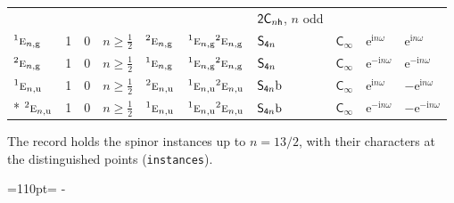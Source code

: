 \documentclass[10pt,a4paper]{article}
\makeatletter
\def\grouprule#1#2{\noalign{\marks\LTgroupmarks{\the\belowrulesep}\nobreak\vskip#1%
  \vskip\aboverulesep}\multispan\LT@cols\unskip{\leaders\hrule\@height#2\hfill\kern\z@}\cr
  \noalign{\penalty\LTrulebreak\vskip\belowrulesep\global\@lastruleclass\z@}}
\newcommand{\needspace}[1]{\par\penalty-100\begingroup\dimen0=#1\relax\dimen2=\pagegoal
  \advance\dimen2-\pagetotal\ifdim\dimen0>\dimen2\relax\ifdim\dimen2>0pt\vfil\break\fi\fi
  \endgroup}
\numberwithin{equation}{section}
\newcommand{\grp}[1]{\mathsf{#1}}
\newcommand{\irr}[1]{\text{\normalfont\scshape #1}}
\newcommand{\conjpair}[1]{{}^{#1}}
\newcommand{\ptag}[1]{\mathrm{#1}}
\newcommand{\iunit}{\mathrm{i}}
\newcommand{\expe}{\mathrm{e}}
\newcommand{\secondclass}{\mathrm{b}}
\makeatother
\begin{document}
{{\begin{longtable}{@{}lrrlllllll@{}}
 &  &  &  &  &  & $\grp{2C_{\mathnormal{n}h}}$, $n$ odd &  &  & \\
\grouprule{0pt}{\lightrulewidth}
$\conjpair{1}\irr{e}_{n,\ptag{g}}$ & 1 & $0$ & $n \ge \tfrac{1}{2}$ & $\conjpair{2}\irr{e}_{n,\ptag{g}}$ & $\conjpair{1}\irr{e}_{n,\ptag{g}}\conjpair{2}\irr{e}_{n,\ptag{g}}$ & $\grp{S_{4\mathnormal{n}}}$ & \href{../../../rotation/data/pdf/Cinf.pdf}{$\grp{C_{\infty}}$} & $\expe^{\iunit n\omega}$ & $\expe^{\iunit n\omega}$\\
$\conjpair{2}\irr{e}_{n,\ptag{g}}$ & 1 & $0$ & $n \ge \tfrac{1}{2}$ & $\conjpair{1}\irr{e}_{n,\ptag{g}}$ & $\conjpair{1}\irr{e}_{n,\ptag{g}}\conjpair{2}\irr{e}_{n,\ptag{g}}$ & $\grp{S_{4\mathnormal{n}}}$ & \href{../../../rotation/data/pdf/Cinf.pdf}{$\grp{C_{\infty}}$} & $\expe^{-\iunit n\omega}$ & $\expe^{-\iunit n\omega}$\\
$\conjpair{1}\irr{e}_{n,\ptag{u}}$ & 1 & $0$ & $n \ge \tfrac{1}{2}$ & $\conjpair{2}\irr{e}_{n,\ptag{u}}$ & $\conjpair{1}\irr{e}_{n,\ptag{u}}\conjpair{2}\irr{e}_{n,\ptag{u}}$ & $\grp{S_{4\mathnormal{n}}}\secondclass$ & \href{../../../rotation/data/pdf/Cinf.pdf}{$\grp{C_{\infty}}$} & $\expe^{\iunit n\omega}$ & $-\expe^{\iunit n\omega}$\\*
$\conjpair{2}\irr{e}_{n,\ptag{u}}$ & 1 & $0$ & $n \ge \tfrac{1}{2}$ & $\conjpair{1}\irr{e}_{n,\ptag{u}}$ & $\conjpair{1}\irr{e}_{n,\ptag{u}}\conjpair{2}\irr{e}_{n,\ptag{u}}$ & $\grp{S_{4\mathnormal{n}}}\secondclass$ & \href{../../../rotation/data/pdf/Cinf.pdf}{$\grp{C_{\infty}}$} & $\expe^{-\iunit n\omega}$ & $-\expe^{-\iunit n\omega}$\\
\bottomrule\end{longtable}}}
The record holds the spinor instances up to $n = 13/2$, with their characters at the distinguished points (\texttt{instances}).
\needspace{110pt}
\end{document}
